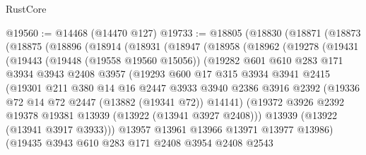 \begin{lexlean}{RustCore}
\begin{coremodule}
@19560 := @14468 (@14470 @127)
@19733 := @18805
    (@18830
      (@18871
        (@18873
          (@18875
            (@18896
              (@18914
                (@18931
                  (@18947
                    (@18958
                      (@18962
                        (@19278
                          (@19431
                            (@19443
                              (@19448 (@19558 @19560 @15056))
                              (@19282
                                @601
                                @610
                                @283
                                @171
                                @3934
                                @3943
                                @2408
                                @3957
                                (@19293
                                  @600
                                  @17
                                  @315
                                  @3934
                                  @3941
                                  @2415
                                  (@19301
                                    @211
                                    @380
                                    @14
                                    @16
                                    @2447
                                    @3933
                                    @3940
                                    @2386
                                    @3916
                                    @2392
                                    (@19336 @72 @14 @72 @2447 (@13882 (@19341 @72)) @14141)
                                    (@19372
                                      @3926
                                      @2392
                                      @19378
                                      @19381
                                      @13939
                                      (@13922 (@13941 @3927 @2408)))
                                    @13939
                                    (@13922 (@13941 @3917 @3933)))
                                  @13957
                                  @13961
                                  @13966
                                  @13971
                                  @13977
                                  @13986)
                                (@19435
                                  @3943
                                  @610
                                  @283
                                  @171
                                  @2408
                                  @3954
                                  @2408
                                  @2543

\end{coremodule}
\end{lexlean}
